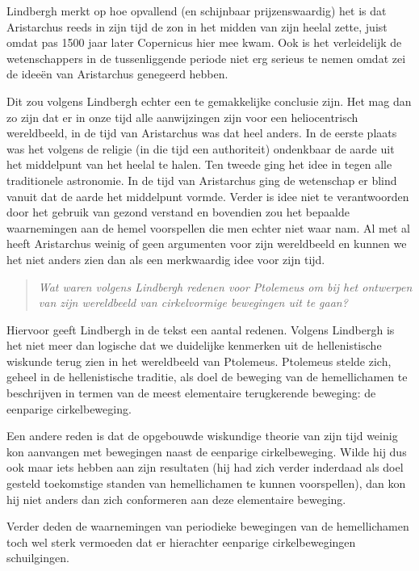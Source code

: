 \documentclass[a4paper,11pt]{article}
\begin{document}
Lindbergh merkt op hoe opvallend (en schijnbaar prijzenswaardig) het is dat
Aristarchus reeds in zijn tijd de zon in het midden van zijn heelal zette,
juist omdat pas 1500 jaar later Copernicus hier mee kwam. Ook is het
verleidelijk de wetenschappers in de tussenliggende periode niet erg serieus
te nemen omdat zei de idee\"en van Aristarchus genegeerd hebben.

Dit zou volgens Lindbergh echter een te gemakkelijke conclusie zijn. Het mag
dan zo zijn dat er in onze tijd alle aanwijzingen zijn voor een heliocentrisch
wereldbeeld, in de tijd van Aristarchus was dat heel anders. In de eerste
plaats was het volgens de religie (in die tijd een authoriteit) ondenkbaar de
aarde uit het middelpunt van het heelal te halen. Ten tweede ging het idee in
tegen alle traditionele astronomie. In de tijd van Aristarchus ging de
wetenschap er blind vanuit dat de aarde het middelpunt vormde. Verder is idee
niet te verantwoorden door het gebruik van gezond verstand en bovendien zou
het bepaalde waarnemingen aan de hemel voorspellen die men echter niet waar
nam. Al met al heeft Aristarchus weinig of geen argumenten voor zijn
wereldbeeld en kunnen we het niet anders zien dan als een merkwaardig idee
voor zijn tijd.


\begin{quote}
\emph{Wat waren volgens Lindbergh redenen voor Ptolemeus om bij het ontwerpen
  van zijn wereldbeeld van cirkelvormige bewegingen uit te gaan?}
\end{quote}


Hiervoor geeft Lindbergh in de tekst een aantal redenen. Volgens Lindbergh is
het niet meer dan logische dat we duidelijke kenmerken uit de hellenistische
wiskunde terug zien in het wereldbeeld van Ptolemeus. Ptolemeus stelde zich,
geheel in de hellenistische traditie, als doel de beweging van de
hemellichamen te beschrijven in termen van de meest elementaire terugkerende
beweging: de eenparige cirkelbeweging.

Een andere reden is dat de opgebouwde wiskundige theorie van zijn tijd weinig
kon aanvangen met bewegingen naast de eenparige cirkelbeweging. Wilde hij dus
ook maar iets hebben aan zijn resultaten (hij had zich verder inderdaad als
doel gesteld toekomstige standen van hemellichamen te kunnen voorspellen), dan
kon hij niet anders dan zich conformeren aan deze elementaire beweging.

Verder deden de waarnemingen van periodieke bewegingen van de hemellichamen
toch wel sterk vermoeden dat er hierachter eenparige cirkelbewegingen
schuilgingen.
\end{document}

